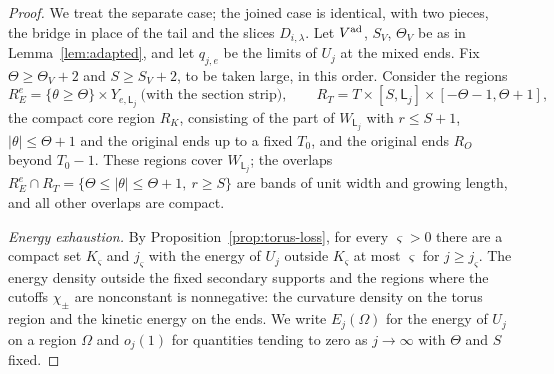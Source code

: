\documentclass[11pt]{amsart}
\theoremstyle{definition}
\theoremstyle{remark}
\theoremstyle{plain}
\numberwithin{equation}{section}
\begin{document}
\begin{proof}
We treat the separate case; the joined case is identical, with two pieces, the
bridge in place of the tail and the slices $D_{i,\lambda}$. Let $V^{\rm ad}$, $S_V$,
$\Theta_V$ be as in Lemma~\ref{lem:adapted}, and let $q_{j,e}$ be the limits of $U_j$ at the
mixed ends. Fix $\Theta\ge\Theta_V+2$ and $S\ge S_V+2$, to be taken large, in this order.
Consider the regions
\[
R_E^e=\{\theta\ge\Theta\}\times Y_{e,\mathsf L_j}\ \text{(with the section strip)},\qquad
R_T=T\times[S,\mathsf L_j]\times[-\Theta-1,\Theta+1],
\]
the compact core region $R_K$, consisting of the part of $W_{\mathsf L_j}$ with $r\le S+1$,
$|\theta|\le\Theta+1$ and the original ends up to a fixed $T_0$, and the original ends
$R_O$ beyond $T_0-1$. These regions cover $W_{\mathsf L_j}$; the overlaps
$R_E^e\cap R_T=\{\Theta\le|\theta|\le\Theta+1,\ r\ge S\}$ are bands of unit width and growing
length, and all other overlaps are compact.

\emph{Energy exhaustion.} By Proposition~\ref{prop:torus-loss}, for every
$\varsigma>0$ there are a compact set $K_\varsigma$ and $j_\varsigma$ with the energy of $U_j$ outside
$K_\varsigma$ at most $\varsigma$ for $j\ge j_\varsigma$. The energy density outside the fixed secondary
supports and the regions where the cutoffs $\chi_\pm$ are nonconstant is nonnegative: the curvature density on the torus
region and the kinetic energy on the ends. We write $E_j(\Omega)$ for the energy of
$U_j$ on a region $\Omega$ and $o_j(1)$ for quantities tending to zero as $j\to\infty$ with
$\Theta$ and $S$ fixed.


\end{proof}
\end{document}
